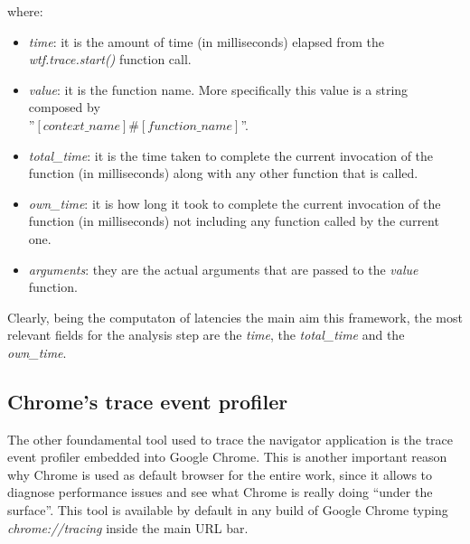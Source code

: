 where:
\begin{itemize}
    \item \emph{time}: it is the amount of time (in milliseconds) elapsed from the
        \emph{wtf.trace.start()} function call.
    \item \emph{value}: it is the function name. More specifically this value is a
        string composed by\\
        ''\([context\_name]\#[function\_name]\)''.
    \item \emph{total\_time}: it is the time taken to complete the current invocation
        of the function (in milliseconds) along with any other function that
        is called.
    \item \emph{own\_time}: it is how long it took to complete the current invocation
        of the function (in milliseconds) not including any function called by
        the current one.
    \item \emph{arguments}: they are the actual arguments that are passed to the
        \emph{value} function.
\end{itemize}

Clearly, being the computaton of latencies the main aim this framework, the most
relevant fields for the analysis step are the \emph{time}, the \emph{total\_time}
and the \emph{own\_time}.


\subsection{Chrome's trace event profiler}
The other foundamental tool used to trace the navigator application is the trace
event profiler embedded into Google Chrome. This is another important reason why
Chrome is used as default browser for the entire work, since it allows to diagnose
performance issues and see what Chrome is really doing ``under the surface''.
This tool is available by default in any build of Google Chrome typing
\emph{chrome://tracing} inside the main URL bar.

